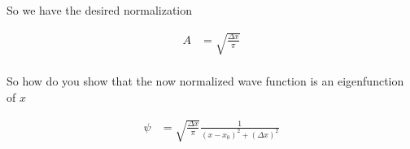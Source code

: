 \documentclass{article}
\begin{document}
So we have the desired normalization

\begin{align*}
A &= \sqrt{\frac{\Delta x}{\pi}} \\
\end{align*}

So how do you show that the now normalized wave function is an eigenfunction of $x$ 

\begin{align*}
\psi &= \sqrt{\frac{\Delta x}{\pi}} \frac{1}{(x-x_0)^2 + (\Delta x)^2}
\\
\end{align*}



\end{document}

